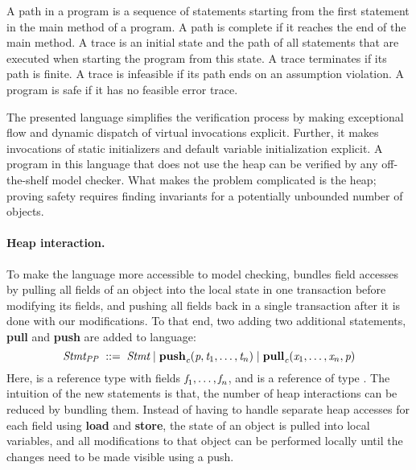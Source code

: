 %
A path in a program is a sequence of statements starting from the first
statement in the \textsf{main} method of a program. A path is complete if it
reaches the end of the \textsf{main} method. A trace is an initial state and the
path of all statements that are executed when starting the program from this
state. A trace terminates if its path is finite. 
A trace is infeasible if its path ends on an assumption violation. 
A program is safe if it has no feasible error trace.



The presented language simplifies the verification process by making exceptional
flow and dynamic dispatch of virtual invocations explicit. Further, it makes
invocations of static initializers and default variable initialization explicit. A program in this language that 
does not use the heap can be verified by any off-the-shelf model checker. What makes
the problem complicated is the heap; proving safety requires finding invariants 
for a potentially unbounded number of objects. 

\paragraph{Heap interaction.} To make the language more accessible to
model checking, \jayhorn bundles field accesses by pulling 
all fields of an object into the local state in one transaction before
modifying its fields, and pushing all fields back in a single 
transaction after it is done with our modifications. To that end, two
adding two additional statements, \textbf{pull} and \textbf{push} are 
added to language:
\begin{equation*}
 \textit{Stmt}_{\mathit{PP}} \; ::= \; \textit{Stmt}
 \; | \; \textbf{push}_\textit{\ensuremath{\textit{c}}}(\textit{p},
     \textit{t}_1,\ldots,\textit{t}_n)
 \; | \; \textbf{pull}_\textit{\ensuremath{\textit{c}}}(\textit{x}_1,\ldots,\textit{x}_n,
\textit{p})
\end{equation*}
Here, \cvar is a reference type with fields $\textit{f}_1,\ldots,\textit{f}_n$,
and \pvar is a reference of type \cvar.  The intuition of the new
statements is that, the number of heap interactions can be reduced
by bundling them. Instead of having to handle separate heap accesses
for each field using \textbf{load} and \textbf{store}, 
the state of an object is pulled into local variables, and
all modifications to that object can be performed locally until
the changes need to be made visible using a push.


